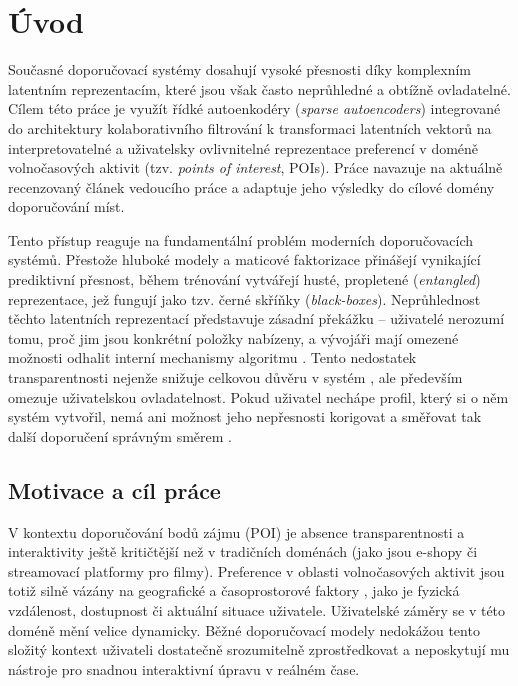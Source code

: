 \chapter*{Úvod}

Současné doporučovací systémy dosahují vysoké přesnosti díky komplexním latentním reprezentacím, které jsou však často neprůhledné a obtížně ovladatelné. Cílem této práce je využít řídké autoenkodéry (\textit{sparse autoencoders}) integrované do architektury kolaborativního filtrování k transformaci latentních vektorů na interpretovatelné a uživatelsky ovlivnitelné reprezentace preferencí v doméně volnočasových aktivit (tzv. \textit{points of interest}, POIs). Práce navazuje na aktuálně recenzovaný článek vedoucího práce \cite{Spisak2024} a adaptuje jeho výsledky do cílové domény doporučování míst.

Tento přístup reaguje na fundamentální problém moderních doporučovacích systémů. Přestože hluboké modely a maticové faktorizace přinášejí vynikající prediktivní přesnost, během trénování vytvářejí husté, propletené (\textit{entangled}) reprezentace, jež fungují jako tzv. černé skříňky (\textit{black-boxes}). Neprůhlednost těchto latentních reprezentací představuje zásadní překážku -- uživatelé nerozumí tomu, proč jim jsou konkrétní položky nabízeny, a vývojáři mají omezené možnosti odhalit interní mechanismy algoritmu \cite{Chen2022}. Tento nedostatek transparentnosti nejenže snižuje celkovou důvěru v systém \cite{Tintarev2022}, ale především omezuje uživatelskou ovladatelnost. Pokud uživatel nechápe profil, který si o něm systém vytvořil, nemá ani možnost jeho nepřesnosti korigovat a směřovat tak další doporučení správným směrem \cite{Ooge2023}.

\section*{Motivace a cíl práce}

V kontextu doporučování bodů zájmu (POI) je absence transparentnosti a interaktivity ještě kritičtější než v tradičních doménách (jako jsou e-shopy či streamovací platformy pro filmy). Preference v oblasti volnočasových aktivit jsou totiž silně vázány na geografické a časoprostorové faktory \cite{Zeng2025}, jako je fyzická vzdálenost, dostupnost či aktuální situace uživatele. Uživatelské záměry se v této doméně mění velice dynamicky. Běžné doporučovací modely nedokážou tento složitý kontext uživateli dostatečně srozumitelně zprostředkovat a neposkytují mu nástroje pro snadnou interaktivní úpravu v reálném čase.

